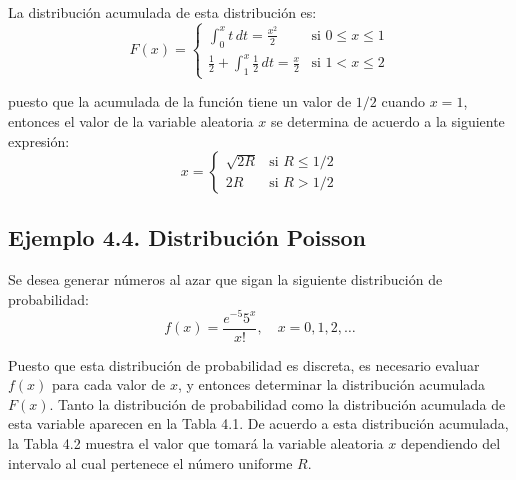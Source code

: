 \documentclass[11pt,letterpaper]{report}
\begin{document}
La distribución acumulada de esta distribución es:
\begin{equation}
F(x) = \begin{cases} 
\int_{0}^{x} t \, dt = \frac{x^2}{2} & \text{si } 0 \le x \le 1 \\[1ex]
\frac{1}{2} + \int_{1}^{x} \frac{1}{2} \, dt = \frac{x}{2} & \text{si } 1 < x \le 2 
\end{cases}
\end{equation}

puesto que la acumulada de la función tiene un valor de $1/2$ cuando $x = 1$, entonces el valor de la variable aleatoria $x$ se determina de acuerdo a la siguiente expresión:
\begin{equation}
x = \begin{cases} 
\sqrt{2R} & \text{si } R \le 1/2 \\ 
2R & \text{si } R > 1/2 
\end{cases}
\end{equation}

\subsection*{Ejemplo 4.4. Distribución Poisson}
Se desea generar números al azar que sigan la siguiente distribución de probabilidad:
\begin{equation}
f(x) = \frac{e^{-5} 5^x}{x!}, \quad x = 0, 1, 2, \dots
\end{equation}

Puesto que esta distribución de probabilidad es discreta, es necesario evaluar $f(x)$ para cada valor de $x$, y entonces determinar la distribución acumulada $F(x)$. Tanto la distribución de probabilidad como la distribución acumulada de esta variable aparecen en la Tabla 4.1. De acuerdo a esta distribución acumulada, la Tabla 4.2 muestra el valor que tomará la variable aleatoria $x$ dependiendo del intervalo al cual pertenece el número uniforme $R$.
\end{document}
